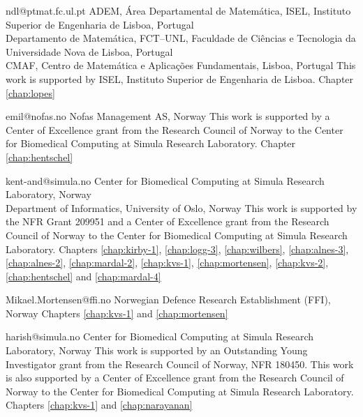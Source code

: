              {ndl@ptmat.fc.ul.pt}
             {ADEM, \'{A}rea Departamental de Matem\'{a}tica,
              ISEL, Instituto Superior de Engenharia de Lisboa, Portugal \\
              Departamento de Matem\'{a}tica, FCT--UNL,
              Faculdade de Ci\^{e}ncias e Tecnologia da Universidade Nova de Lisboa, Portugal \\
              CMAF, Centro de Matem\'{a}tica e Aplica\c{c}\~{o}es Fundamentais, Lisboa, Portugal}
              {This work is supported by ISEL, Instituto Superior de Engenharia de Lisboa.}
              {Chapter \ref{chap:lopes}}

             {emil@nofas.no}
             {Nofas Management AS, Norway}
             {This work is supported by a Center of Excellence
              grant from the Research Council of Norway to the Center
              for Biomedical Computing at Simula Research
              Laboratory.}
             {Chapter \ref{chap:hentschel}}

             {kent-and@simula.no}
             {Center for Biomedical Computing at Simula Research Laboratory, Norway \\
              Department of Informatics, University of Oslo, Norway}
             {This work is supported by
              the NFR Grant 209951 and
              a Center of Excellence grant
              from the Research Council of Norway to the Center for
              Biomedical Computing at Simula Research Laboratory.}
             {Chapters
              \ref{chap:kirby-1}, \ref{chap:logg-3}, \ref{chap:wilbers},
              \ref{chap:alnes-3}, \ref{chap:alnes-2}, \ref{chap:mardal-2},
              \ref{chap:kvs-1}, \ref{chap:mortensen}, \ref{chap:kvs-2},
              \ref{chap:hentschel} and \ref{chap:mardal-4}}

             {Mikael.Mortensen@ffi.no}
             {Norwegian Defence Research Establishment (FFI), Norway}
             {}
             {Chapters \ref{chap:kvs-1} and \ref{chap:mortensen}}

             {harish@simula.no}
             {Center for Biomedical Computing at Simula Research Laboratory, Norway}
             {This work is supported by an Outstanding Young
              Investigator grant from the Research Council of Norway,
              NFR 180450. This work is also supported by a Center of
              Excellence grant from the Research Council of Norway to
              the Center for Biomedical Computing at Simula Research
              Laboratory.}
             {Chapters \ref{chap:kvs-1} and \ref{chap:narayanan}}

